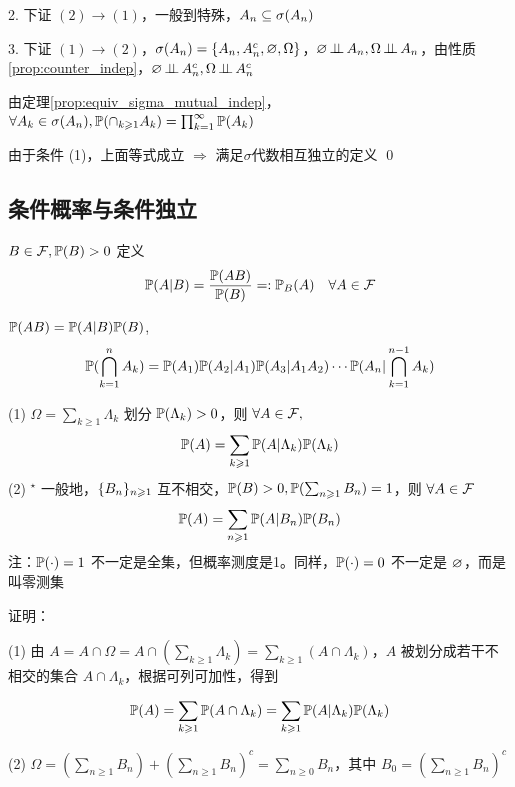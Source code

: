 2. 下证 $(2)\rightarrow (1)$，一般到特殊，$A_n\subseteq \sigma(A_n)$

3. 下证 $(1)\rightarrow (2)$，$\sigma(A_n)=\{A_n,A_n^c, \varnothing, \Omega\}$，$\varnothing\operatorname{\perp\!\!\!\perp} A_n, \Omega\operatorname{\perp\!\!\!\perp} A_n$，由性质\ref{prop:counter_indep}，$\varnothing\operatorname{\perp\!\!\!\perp} A_n^c, \Omega\operatorname{\perp\!\!\!\perp} A_n^c$

由定理\ref{prop:equiv_sigma_mutual_indep}，$\forall A_k\in \sigma(A_n), \mathbb{P}(\cap_{k\geqslant 1}A_k)=\prod_{k=1}^{\infty}\mathbb{P}(A_k)$

由于条件 (1)，上面等式成立 $\Rightarrow$ 满足$\sigma$代数相互独立的定义 \qed

\subsection{条件概率与条件独立}

\begin{definition}[条件概率]\label{def:con_prob}
    $B\in \mathcal{F}, \mathbb{P}(B)>0$ 定义
    \[
    \mathbb{P}(A|B)=\frac{\mathbb{P}(AB)}{\mathbb{P}(B)}=: \mathbb{P}_B(A)\quad \forall A\in \mathcal{F}
    \]
\end{definition}

\begin{theorem}[乘法公式]\label{thm:multiply_func}
    $\mathbb{P}(AB)=\mathbb{P}(A|B)\mathbb{P}(B)$,
    \[
    \mathbb{P}(\bigcap_{k=1}^{n}A_k)=\mathbb{P}(A_1)\mathbb{P}(A_2|A_1)\mathbb{P}(A_3|A_1A_2)\cdots \mathbb{P}(A_n|\bigcap_{k=1}^{n-1}A_k)
    \]
\end{theorem}

\begin{theorem}[全概公式]\label{thm:law_total_prob}
    (1) $\Omega=\sum_{k\geq 1}\Lambda_k$ 划分 $\mathbb{P}(\Lambda_k)>0$，则 $\forall A\in \mathcal{F},$
    \[
    \mathbb{P}(A)=\sum_{k\geqslant 1}\mathbb{P}(A|\Lambda_k)\mathbb{P}(\Lambda_k)
    \]
    (2) $^\star$ 一般地，$\{{B}_{n}\}_{n \geqslant 1}$ 互不相交，$\mathbb{P}(B)>0, \mathbb{P}(\sum_{n\geqslant 1}B_n)=1$，则 $\forall A\in \mathcal{F}$
    \[
    \mathbb{P}(A)=\sum_{n\geqslant 1}\mathbb{P}(A|B_n)\mathbb{P}(B_n)
    \]
    注：$\mathbb{P}(\cdot)=1$ 不一定是全集，但概率测度是1。同样，$\mathbb{P}(\cdot)=0$ 不一定是 $\varnothing$，而是叫零测集
\end{theorem}

证明：

(1) 由 $A=A\cap\Omega=A\cap (\sum_{k\geq 1}\Lambda_k)=\sum_{k\geq 1}(A\cap \Lambda_k)$，$A$ 被划分成若干不相交的集合 $A\cap \Lambda_k$，根据可列可加性，得到 

\[
\mathbb{P}(A)=\sum_{k\geqslant 1}\mathbb{P}(A\cap \Lambda_k)=\sum_{k\geqslant 1}\mathbb{P}(A|\Lambda_k)\mathbb{P}(\Lambda_k)
\]

(2) $\Omega=(\sum_{n\geq 1}B_n)+(\sum_{n\geq 1}B_n)^c=\sum_{n\geq 0}B_n$，其中 $B_0=(\sum_{n\geq 1}B_n)^c$

